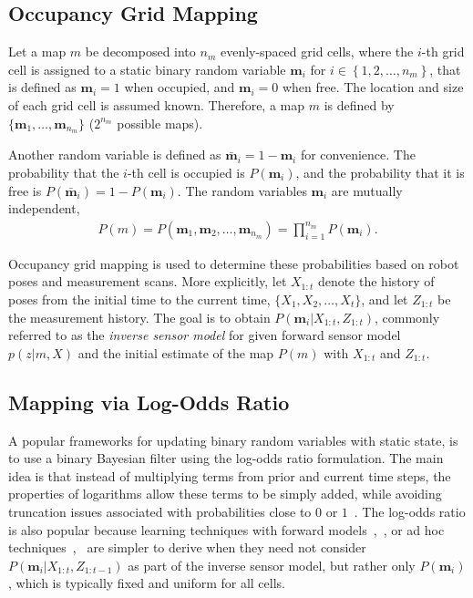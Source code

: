 \documentclass[letterpaper, 10pt, conference]{ieeeconf}
\newcommand{\braces}[1]{\ensuremath{\left\{ #1 \right\}}}
\begin{document}
	
\subsection{Occupancy Grid Mapping}

Let a map $m$ be decomposed into $n_m$ evenly-spaced grid cells, where the $i$-th grid cell is assigned to a static binary random variable $\mathbf{m}_i$ for $i\in\braces{1,2,\ldots,n_m}$, that is defined as $\mathbf{m}_i=1$ when occupied, and $\mathbf{m}_i=0$ when free. The location and size of each grid cell is assumed known. Therefore, a map $m$ is defined by $\{\mathbf{m}_1,\ldots, \mathbf{m}_{n_m}\}$ ($2^{n_{m}}$ possible maps). 

Another random variable is defined as $\bar{\mathbf{m}}_i=1-\mathbf{m}_i$ for convenience. The probability that the $i$-th cell is occupied is $P(\mathbf{m}_i)$, and the probability that it is free is $P(\bar{\mathbf{m}}_i)=1-P(\mathbf{m}_i)$. The random variables $\mathbf{m}_i$ are mutually independent, 
\begin{align}
P(m)=P(\mathbf{m}_1,\mathbf{m}_2,\ldots,\mathbf{m}_{n_m})=\prod_{i=1}^{n_m}P(\mathbf{m}_i).
\end{align}

Occupancy grid mapping  is used to determine these probabilities based on robot poses and measurement scans. More explicitly, let $X_{1:t}$ denote the history of poses from the initial time to the current time, $\{X_1,X_2,\ldots, X_t\}$, and let $Z_{1:t}$ be the measurement history. The goal is to obtain $P(\mathbf{m}_i|X_{1:t},Z_{1:t})$, commonly referred to as the \emph{inverse sensor model} for given forward sensor model $p(z|m,X)$ and the initial estimate of the map $P(m)$ with $X_{1:t}$ and $Z_{1:t}$.

	
\subsection{Mapping via Log-Odds Ratio}

A popular frameworks for updating binary random variables with static state, is to use a binary Bayesian filter using the log-odds ratio formulation.
The main idea is that instead of multiplying terms from prior and current time steps, the properties of logarithms allow these terms to be simply added, while avoiding truncation issues associated with probabilities close to $0$ or $1$~\cite{ThrBurFox05}.
The log-odds ratio is also popular because learning techniques with forward models~\cite{Thr01},~\cite{Thr03}, or ad hoc techniques~\cite{MorElf85},~\cite{Elf89} are simpler to derive when they need not consider $P(\mathbf{m}_i|X_{1:t},Z_{1:t-1})$ as part of the inverse sensor model, but rather only $P(\mathbf{m}_i)$, which is typically fixed and uniform for all cells.
\end{document}

